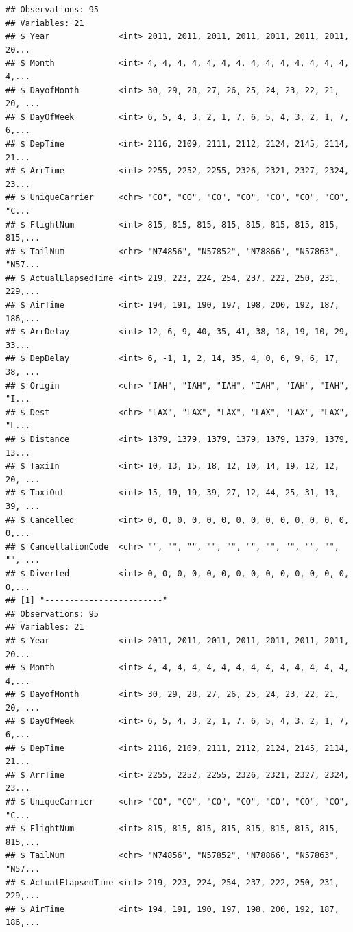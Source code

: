 \documentclass[]{book}
\theoremstyle{definition}
\theoremstyle{definition}
\theoremstyle{definition}
\theoremstyle{remark}
\begin{document}
\begin{verbatim}
## Observations: 95
## Variables: 21
## $ Year              <int> 2011, 2011, 2011, 2011, 2011, 2011, 2011, 20...
## $ Month             <int> 4, 4, 4, 4, 4, 4, 4, 4, 4, 4, 4, 4, 4, 4, 4,...
## $ DayofMonth        <int> 30, 29, 28, 27, 26, 25, 24, 23, 22, 21, 20, ...
## $ DayOfWeek         <int> 6, 5, 4, 3, 2, 1, 7, 6, 5, 4, 3, 2, 1, 7, 6,...
## $ DepTime           <int> 2116, 2109, 2111, 2112, 2124, 2145, 2114, 21...
## $ ArrTime           <int> 2255, 2252, 2255, 2326, 2321, 2327, 2324, 23...
## $ UniqueCarrier     <chr> "CO", "CO", "CO", "CO", "CO", "CO", "CO", "C...
## $ FlightNum         <int> 815, 815, 815, 815, 815, 815, 815, 815, 815,...
## $ TailNum           <chr> "N74856", "N57852", "N78866", "N57863", "N57...
## $ ActualElapsedTime <int> 219, 223, 224, 254, 237, 222, 250, 231, 229,...
## $ AirTime           <int> 194, 191, 190, 197, 198, 200, 192, 187, 186,...
## $ ArrDelay          <int> 12, 6, 9, 40, 35, 41, 38, 18, 19, 10, 29, 33...
## $ DepDelay          <int> 6, -1, 1, 2, 14, 35, 4, 0, 6, 9, 6, 17, 38, ...
## $ Origin            <chr> "IAH", "IAH", "IAH", "IAH", "IAH", "IAH", "I...
## $ Dest              <chr> "LAX", "LAX", "LAX", "LAX", "LAX", "LAX", "L...
## $ Distance          <int> 1379, 1379, 1379, 1379, 1379, 1379, 1379, 13...
## $ TaxiIn            <int> 10, 13, 15, 18, 12, 10, 14, 19, 12, 12, 20, ...
## $ TaxiOut           <int> 15, 19, 19, 39, 27, 12, 44, 25, 31, 13, 39, ...
## $ Cancelled         <int> 0, 0, 0, 0, 0, 0, 0, 0, 0, 0, 0, 0, 0, 0, 0,...
## $ CancellationCode  <chr> "", "", "", "", "", "", "", "", "", "", "", ...
## $ Diverted          <int> 0, 0, 0, 0, 0, 0, 0, 0, 0, 0, 0, 0, 0, 0, 0,...
## [1] "------------------------"
## Observations: 95
## Variables: 21
## $ Year              <int> 2011, 2011, 2011, 2011, 2011, 2011, 2011, 20...
## $ Month             <int> 4, 4, 4, 4, 4, 4, 4, 4, 4, 4, 4, 4, 4, 4, 4,...
## $ DayofMonth        <int> 30, 29, 28, 27, 26, 25, 24, 23, 22, 21, 20, ...
## $ DayOfWeek         <int> 6, 5, 4, 3, 2, 1, 7, 6, 5, 4, 3, 2, 1, 7, 6,...
## $ DepTime           <int> 2116, 2109, 2111, 2112, 2124, 2145, 2114, 21...
## $ ArrTime           <int> 2255, 2252, 2255, 2326, 2321, 2327, 2324, 23...
## $ UniqueCarrier     <chr> "CO", "CO", "CO", "CO", "CO", "CO", "CO", "C...
## $ FlightNum         <int> 815, 815, 815, 815, 815, 815, 815, 815, 815,...
## $ TailNum           <chr> "N74856", "N57852", "N78866", "N57863", "N57...
## $ ActualElapsedTime <int> 219, 223, 224, 254, 237, 222, 250, 231, 229,...
## $ AirTime           <int> 194, 191, 190, 197, 198, 200, 192, 187, 186,...

\end{verbatim}
\end{document}
